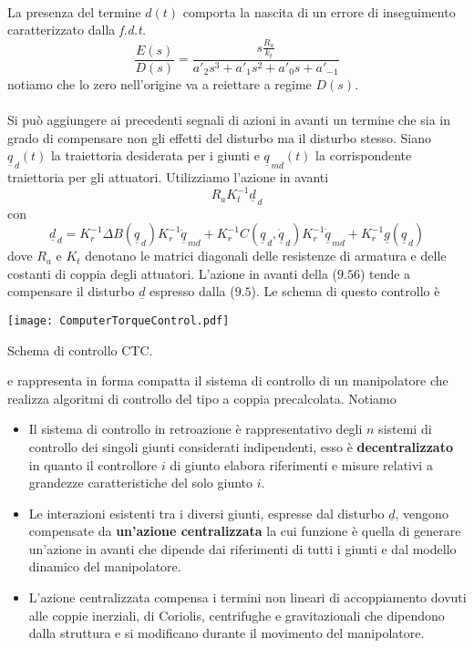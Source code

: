 \paragraph{}
La presenza del termine $d(t)$ comporta la nascita di un errore di inseguimento caratterizzato dalla \emph{f.d.t.}
\begin{equation}
	\frac{E(s)}{D(s)} = \frac{s \frac{R_a}{k_t}}{a'_2 s^3 + a'_1 s^2 + a'_0 s + a'_{-1}}
\end{equation}
notiamo che lo zero nell'origine va a reiettare a regime $D(s)$.

\paragraph{}
Si può aggiungere ai precedenti segnali di azioni in avanti un termine che sia in grado di compensare non gli effetti del disturbo ma il disturbo stesso. Siano $\underline{q}_{\,d}(t)$ la traiettoria desiderata per i giunti e $\underline{q}_{\,md}(t)$ la corrispondente traiettoria per gli attuatori. Utilizziamo l'azione in avanti
\begin{equation}
	R_a K_t^{-1} \underline{d}_{\,d}
\end{equation}
con
\begin{equation}
	\underline{d}_{\,d} = K_r^{-1} \Delta B(\underline{q}_{\,d}) K_r^{-1} \underline{\ddot{q}}_{\,md} + K_r^{-1} C(\underline{q}_{\,d}, \underline{\dot{q}}_{\,d}) K_r^{-1} \underline{\dot{q}}_{\,md} + K_r^{-1}\underline{g}(\underline{q}_{\,d})
\end{equation}
dove $R_a$ e $K_t$ denotano le matrici diagonali delle resistenze di armatura e delle costanti di coppia degli attuatori. L'azione in avanti della ($9.56$) tende a compensare il disturbo $\underline{d}$ espresso dalla ($9.5$). Le schema di questo controllo è
\begin{center}
	\texttt{[image: ComputerTorqueControl.pdf]}
	\caption{Schema di controllo CTC.}
\end{center}
e rappresenta in forma compatta il sistema di controllo di un manipolatore che realizza algoritmi di controllo del tipo  a coppia precalcolata. Notiamo

\begin{itemize}
	\item Il sistema di controllo in retroazione è rappresentativo degli $n$ sistemi di controllo dei singoli giunti considerati indipendenti, esso è \textbf{decentralizzato} in quanto il controllore $i$ di giunto elabora riferimenti e misure relativi a grandezze caratteristiche del solo giunto $i$.
	\item Le interazioni esistenti tra i diversi giunti, espresse dal disturbo $\underline{d}$, vengono compensate da \textbf{un'azione centralizzata} la cui funzione è quella di generare un'azione in avanti che dipende dai riferimenti di tutti i giunti e dal modello dinamico del manipolatore.
	\item L'azione centralizzata compensa i termini non lineari di accoppiamento dovuti alle coppie inerziali, di Coriolis, centrifughe e gravitazionali che dipendono dalla struttura e si modificano durante il movimento del manipolatore.
\end{itemize}